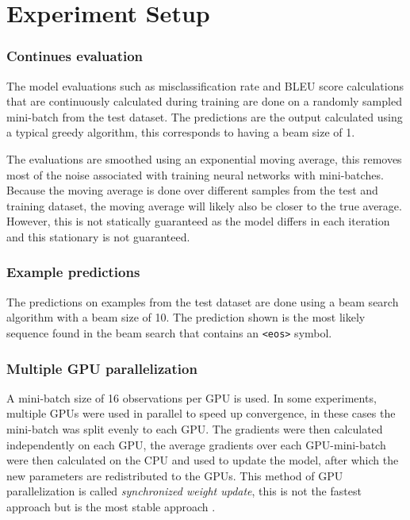 
\section{Experiment Setup}

\subsubsection{Continues evaluation}
The model evaluations such as misclassification rate and BLEU score calculations that are continuously calculated during training are done on a randomly sampled mini-batch from the test dataset. The predictions are the output calculated using a typical greedy algorithm, this corresponds to having a beam size of 1.

The evaluations are smoothed using an exponential moving average, this removes most of the noise associated with training neural networks with mini-batches. Because the moving average is done over different samples from the test and training dataset, the moving average will likely also be closer to the true average. However, this is not statically guaranteed as the model differs in each iteration and this stationary is not guaranteed.

\subsubsection{Example predictions}
The predictions on examples from the test dataset are done using a beam search algorithm with a beam size of 10. The prediction shown is the most likely sequence found in the beam search that contains an \texttt{<eos>} symbol.

\subsubsection{Multiple GPU parallelization}
A mini-batch size of 16 observations per GPU is used. In some experiments, multiple GPUs were used in parallel to speed up convergence, in these cases the mini-batch was split evenly to each GPU. The gradients were then calculated independently on each GPU, the average gradients over each GPU-mini-batch were then calculated on the CPU and used to update the model, after which the new parameters are redistributed to the GPUs. This method of GPU parallelization is called \textit{synchronized weight update}, this is not the fastest approach but is the most stable approach \cite[https://arxiv.org/pdf/1609.08326.pdf]{citation-needed}.
